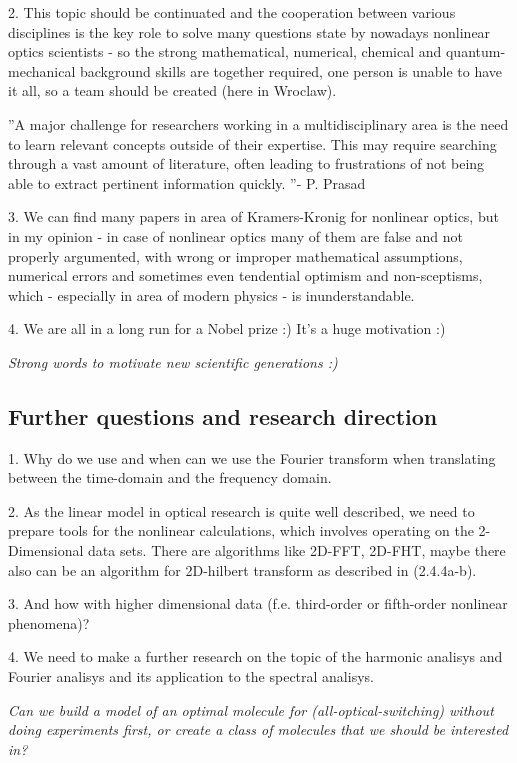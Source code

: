 \documentclass[12pt,twoside,a4paper]{article}
\numberwithin{equation}{subsection}
\numberwithin{figure}{subsection}
\begin{document}
2. This topic should be continuated and the cooperation between various disciplines is the key role to solve many questions state
by nowadays nonlinear optics scientists - so the strong mathematical, numerical, chemical and quantum-mechanical background skills
are together required, one person is unable to have it all, so a team should be created (here in Wroclaw).

''A major challenge for researchers working in a multidisciplinary area is the need to learn relevant concepts outside of their
expertise. This may require searching through a vast amount of literature, often leading to frustrations of not being able to
extract pertinent information quickly. ''- P. Prasad \cite{prasad_nanophotonics}

3. We can find many papers in area of Kramers-Kronig for nonlinear optics, but in my opinion - in case of nonlinear optics many of
them are false and not properly argumented, with wrong or improper mathematical assumptions, numerical errors and sometimes even
tendential optimism and non-sceptisms, which - especially in area of modern physics - is inunderstandable.

4. We are all in a long run for a Nobel prize :) It's a huge motivation :)

\textit{Strong words to motivate new scientific generations :)}

\subsection{Further questions and research direction} \label{chap:conclusion_further}

1. Why do we use and when can we use the Fourier transform when translating between the time-domain and the frequency domain.

2. As the linear model in optical research is quite well described, we need to prepare tools for the nonlinear calculations, which
involves operating on the 2-Dimensional data sets. There are algorithms like 2D-FFT, 2D-FHT, maybe there also can be an algorithm
for 2D-hilbert transform as described in (2.4.4a-b). 

3. And how with higher dimensional data (f.e. third-order or fifth-order nonlinear phenomena)?

4. We need to make a further research on the topic of the harmonic analisys and Fourier analisys and its application to the
spectral analisys.

\textit{Can we build a model of an optimal molecule for (all-optical-switching) without doing experiments first, or create a class
of molecules that we should be interested in?}
\end{document}
